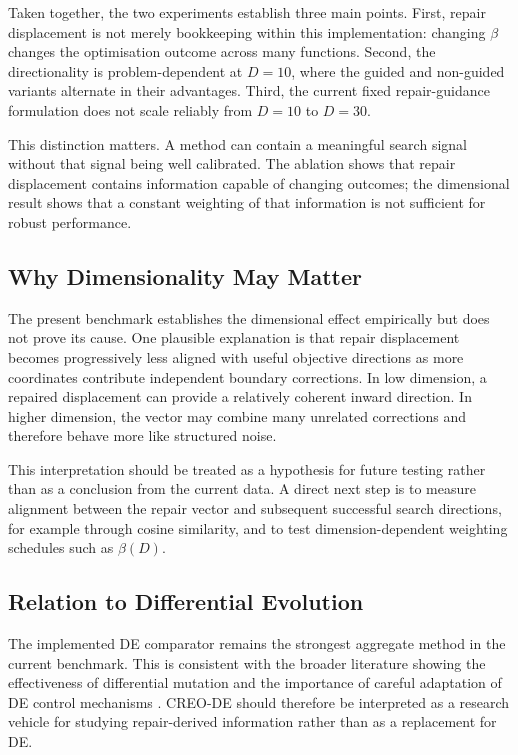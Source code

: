 \documentclass[a4paper,fleqn]{cas-sc}
\begin{document}
Taken together, the two experiments establish three main points. First, repair displacement is not merely bookkeeping within this implementation: changing $\beta$ changes the optimisation outcome across many functions. Second, the directionality is problem-dependent at $D=10$, where the guided and non-guided variants alternate in their advantages. Third, the current fixed repair-guidance formulation does not scale reliably from $D=10$ to $D=30$.

This distinction matters. A method can contain a meaningful search signal without that signal being well calibrated. The ablation shows that repair displacement contains information capable of changing outcomes; the dimensional result shows that a constant weighting of that information is not sufficient for robust performance.

\subsection{Why Dimensionality May Matter}

The present benchmark establishes the dimensional effect empirically but does not prove its cause. One plausible explanation is that repair displacement becomes progressively less aligned with useful objective directions as more coordinates contribute independent boundary corrections. In low dimension, a repaired displacement can provide a relatively coherent inward direction. In higher dimension, the vector may combine many unrelated corrections and therefore behave more like structured noise.

This interpretation should be treated as a hypothesis for future testing rather than as a conclusion from the current data. A direct next step is to measure alignment between the repair vector and subsequent successful search directions, for example through cosine similarity, and to test dimension-dependent weighting schedules such as $\beta(D)$.

\subsection{Relation to Differential Evolution}

The implemented DE comparator remains the strongest aggregate method in the current benchmark. This is consistent with the broader literature showing the effectiveness of differential mutation and the importance of careful adaptation of DE control mechanisms \cite{das2011differential,brest2006self,qin2009sade,tanabe2014lshade}. CREO-DE should therefore be interpreted as a research vehicle for studying repair-derived information rather than as a replacement for DE.
\end{document}
